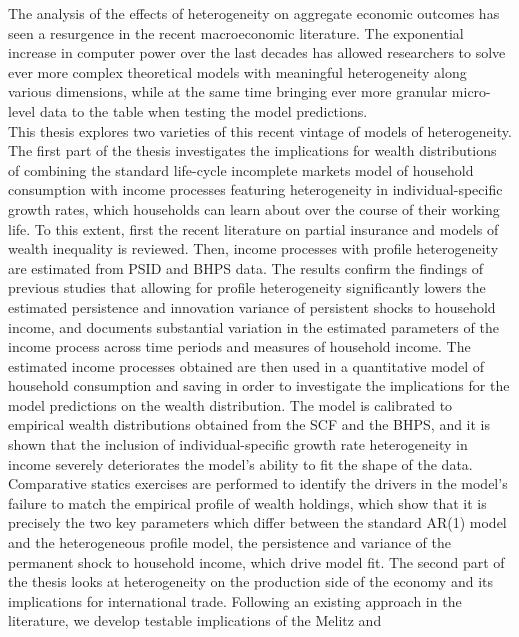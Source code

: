\thispagestyle{plain}

The analysis of the effects of heterogeneity on aggregate economic outcomes has 
seen a resurgence in the recent macroeconomic literature. The exponential increase
 in computer power over the last decades has allowed researchers to solve ever 
more complex theoretical models with meaningful heterogeneity along various 
dimensions, while at the same time bringing ever more granular micro-level data 
to the table when testing the model predictions. \\
This thesis explores two varieties of this recent vintage of models of heterogeneity.
The first part of the thesis investigates the implications for wealth distributions
of combining the standard life-cycle incomplete markets model of household 
consumption with income processes featuring heterogeneity in individual-specific
growth rates, which households can learn about over the course of their working life.
To this extent, first the recent literature on partial insurance and models
of wealth inequality is reviewed. Then, income processes with profile heterogeneity
 are estimated from PSID and BHPS data. The results confirm the findings of 
previous studies that allowing for profile heterogeneity significantly lowers
the estimated persistence and innovation variance of persistent shocks to household
income, and documents substantial variation in the estimated parameters of the 
income process across time periods and measures of household income.
The estimated income processes obtained are then used in a quantitative model of 
household consumption and saving in order to investigate the implications for the 
model predictions on the wealth distribution. The model is calibrated to
 empirical wealth distributions obtained from the SCF and the BHPS, and it is shown
that the inclusion of individual-specific growth rate heterogeneity in income 
severely deteriorates the model's ability to fit the shape of the data. 
Comparative statics exercises are performed to identify the drivers in the model's
failure to match the empirical profile of wealth holdings, which show that it 
is precisely the two key parameters which differ between the standard AR(1) model
and the heterogeneous profile model, the persistence and variance of the permanent
shock to household income, which drive model fit. 
The second part of the thesis looks at heterogeneity on the production side of 
the economy and its implications for international trade. Following an existing 
approach in the literature, we develop testable implications of the Melitz and 

